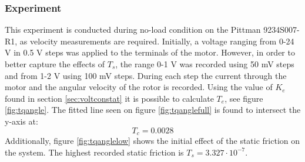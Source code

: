 \subsubsection{Experiment}
This experiment is conducted during no-load condition on the Pittman 9234S007-R1, as velocity measurements are required.
Initially, a voltage ranging from 0-24 V in 0.5 V steps was applied to the terminals of the motor. However, in order to better capture the effects of $T_s$, the range 0-1 V was recorded using 50 mV steps and from 1-2 V using 100 mV steps.
During each step the current through the motor and the angular velocity of the rotor is recorded.
Using the value of $K_e$ found in section \ref{sec:voltconstat} it is possible to calculate $T_e$, see figure \ref{fig:tqangle}. The fitted line seen on figure \ref{fig:tqanglefull} is found to intersect the y-axis at:
$$T_c=0.0028$$
Additionally, figure \ref{fig:tqanglelow} shows the initial effect of the static friction on the system.
The highest recorded static friction is $T_s=3.327\cdot10^{-7}$.
